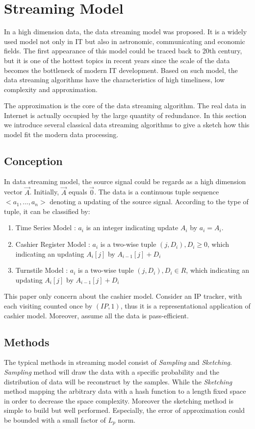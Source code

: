 \documentclass{article} %
\begin{document}
\section{Streaming Model}
In a high dimension data, the data streaming model was proposed. It is a widely used model not only in IT but also in astronomic, communicating and economic fields. The first appearance of this model could be traced back to 20th century, but it is one of the hottest topics in recent years since the scale of the data becomes the bottleneck of modern IT development. Based on such model, the data streaming algorithms have the characteristics of high timeliness, low complexity and approximation.

The approximation is the core of the data streaming algorithm. The real data in Internet is actually occupied by the large quantity of redundance. In this section we introduce several classical data streaming algorithms to give a sketch how this model fit the modern data processing.

\subsection{Conception}
In data streaming model, the source signal could be regards as a high dimension vector $\vec{A}$. Initially, $\vec{A}$ equals $\vec{0}$.  The data is a continuous tuple sequence $<a_1, ..., a_n>$ denoting a updating of the source signal. According to the type of tuple, it can be classified by:
\begin{enumerate}
\item Time Series Model : $a_i$ is an integer indicating update $A_i$ by $a_i = A_i$.
\item Cashier Register Model : $a_i$ is a two-wise tuple $(j, D_i), D_i \ge 0$, which indicating an updating $A_i[j]$ by $A_{i-1}[j] + D_i$
\item Turnstile Model : $a_i$ is a two-wise tuple $(j, D_i), D_i \in R$, which indicating an updating $A_i[j]$ by $A_{i-1}[j] + D_i$
\end{enumerate}
This paper only concern about the cashier model. Consider an IP tracker, with each visiting counted once by $(IP, 1)$, thus it is a representational application of cashier model. Moreover, assume all the data is pass-efficient.

\subsection{Methods}
The typical methods in streaming model consist of \emph{Sampling} and \emph{Sketching}. \emph{Sampling} method will draw the data with a specific probability and the distribution of data will be reconstruct by the samples. While the \emph{Sketching} method mapping the arbitrary data with a hash function to a length fixed space in order to decrease the space complexity. Moreover the sketching method is simple to build but well performed. Especially, the error of approximation could be bounded with a small factor of $L_p$ norm.
\end{document}
